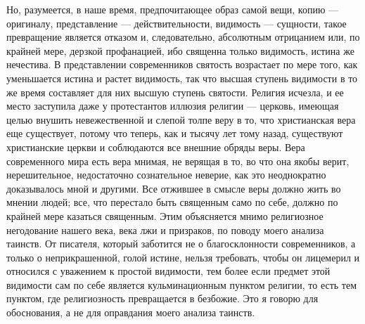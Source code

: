 \documentclass[12pt,oneside]{book}
\begin{document}
Но, разумеется, в наше время, предпочитающее образ самой вещи, копию --- оригиналу, представление --- действительности, видимость --- сущности, такое превращение является отказом и, следовательно, абсолютным отрицанием или, по крайней мере, дерзкой профанацией, ибо священна только видимость, истина же нечестива. В представлении современников святость возрастает по мере того, как уменьшается истина и растет видимость, так что высшая ступень видимости в то же время составляет для них высшую ступень святости. Религия исчезла, и ее место заступила даже у протестантов иллюзия религии --- церковь, имеющая целью внушить невежественной и слепой толпе веру в то, что христианская вера еще существует, потому что теперь, как и тысячу лет тому назад, существуют христианские церкви и соблюдаются все внешние обряды веры. Вера современного мира есть вера мнимая, не верящая в то, во что она якобы верит, нерешительное, недостаточно сознательное неверие, как это неоднократно доказывалось мной и другими. Все отжившее в смысле веры должно жить во мнении людей; все, что перестало быть священным само по себе, должно по крайней мере казаться священным. Этим объясняется мнимо религиозное негодование нашего века, века лжи и призраков, по поводу моего анализа таинств. От писателя, который заботится не о благосклонности современников, а только о неприкрашенной, голой истине, нельзя требовать, чтобы он лицемерил и относился с уважением к простой видимости, тем более если предмет этой видимости сам по себе является кульминационным пунктом религии, то есть тем пунктом, где религиозность превращается в безбожие. Это я говорю для обоснования, а не для оправдания моего анализа таинств.
\end{document}

